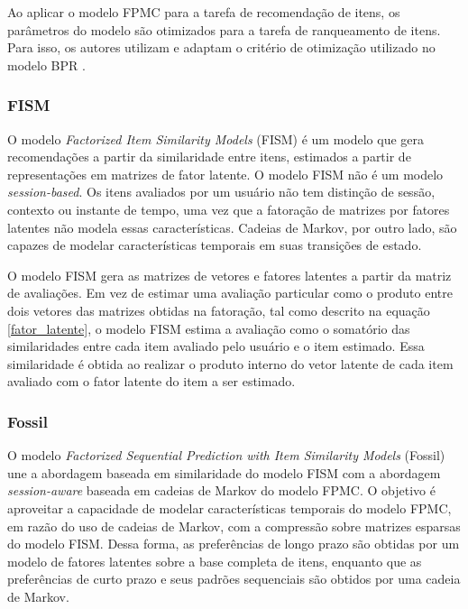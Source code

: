 Ao aplicar o modelo FPMC para a tarefa de recomendação de itens, os parâmetros
do modelo são otimizados para a tarefa de ranqueamento de itens. Para isso, os
autores utilizam e adaptam o critério de otimização utilizado no modelo BPR
\cite{rendle2009}.

\subsubsection{FISM}
O modelo \textit{Factorized Item Similarity Models} (FISM) \cite{kabbur2013fism}
é um modelo que gera recomendações a partir da similaridade entre itens,
estimados a partir de representações em matrizes de fator latente. O modelo FISM
não é um modelo \textit{session-based}. Os itens avaliados por um usuário não
tem distinção de sessão, contexto ou instante de tempo, uma vez que a fatoração
de matrizes por fatores latentes não modela essas características. Cadeias de
Markov, por outro lado, são capazes de modelar características temporais em suas
transições de estado.


O modelo FISM gera as matrizes de vetores e fatores latentes a partir da matriz
de avaliações. Em vez de estimar uma avaliação particular como o produto entre
dois vetores das matrizes obtidas na fatoração, tal como descrito na equação
\ref{fator_latente}, o modelo FISM estima a avaliação como o somatório das
similaridades entre cada item avaliado pelo usuário e o item estimado. Essa
similaridade é obtida ao realizar o produto interno do vetor latente de cada
item avaliado com o fator latente do item a ser estimado.

\subsubsection{Fossil}
O modelo \textit{Factorized Sequential Prediction with Item Similarity Models}
(Fossil) \cite{fossil} une a abordagem baseada em similaridade do modelo FISM com a abordagem
\textit{session-aware} baseada em cadeias de Markov do modelo FPMC. O objetivo é
aproveitar a capacidade de modelar características temporais do modelo FPMC, em
razão do uso de cadeias de Markov, com a compressão sobre matrizes esparsas do
modelo FISM. Dessa forma, as preferências de longo prazo são obtidas por um
modelo de fatores latentes sobre a base completa de itens, enquanto que as
preferências de curto prazo e seus padrões sequenciais são obtidos por uma
cadeia de Markov.

